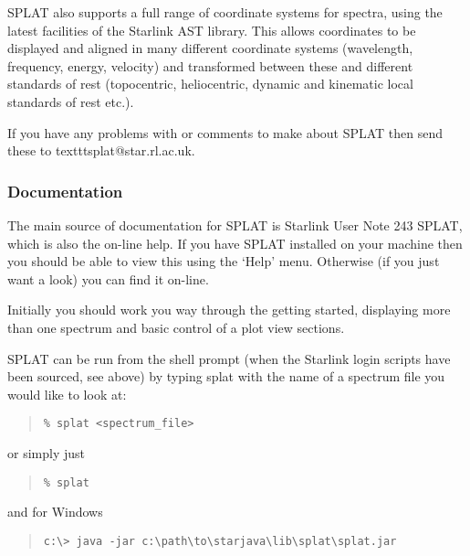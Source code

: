\documentclass[twoside,11pt]{article}
\newcommand{\htmladdnormallink}[2]{#1}
\newcommand{\xref}[3]{#1}
\renewcommand{\_}{\texttt{\symbol{95}}}
\begin{document}
SPLAT also supports a full range of coordinate systems for spectra, using the 
latest facilities of the Starlink AST library. This allows coordinates to be 
displayed and aligned in many different coordinate systems (wavelength, frequency, 
energy, velocity) and transformed between these and different standards of rest 
(topocentric, heliocentric, dynamic and kinematic local standards of rest etc.).

If you have any problems with or comments to make about SPLAT then send \\
these to
\htmladdnormallink{texttt{splat@star.rl.ac.uk}}{splat@star.rl.ac.uk}.

\subsubsection{Documentation}

The main source of documentation for SPLAT is Starlink User Note 243 
\xref{SPLAT}{sun243}{}, which is 
also the on-line help. If you have SPLAT installed on your machine then you 
should be able to view this using the `Help' menu. Otherwise (if you just 
want a look) you can find it on-line.

Initially you should work you way through the getting started, displaying more 
than one spectrum and basic control of a plot view sections.

SPLAT can be run from the shell prompt (when the Starlink login scripts have 
been sourced, see above) by typing splat with the name of a spectrum
file you would like to look at:

\begin{quote}
\begin{verbatim}
% splat <spectrum_file>
\end{verbatim}
\end{quote}

or simply just

\begin{quote}
\begin{verbatim}
% splat
\end{verbatim}
\end{quote}


and for Windows

\begin{quote}
\begin{verbatim}
c:\> java -jar c:\path\to\starjava\lib\splat\splat.jar
\end{verbatim}
\end{quote}
\end{document}
